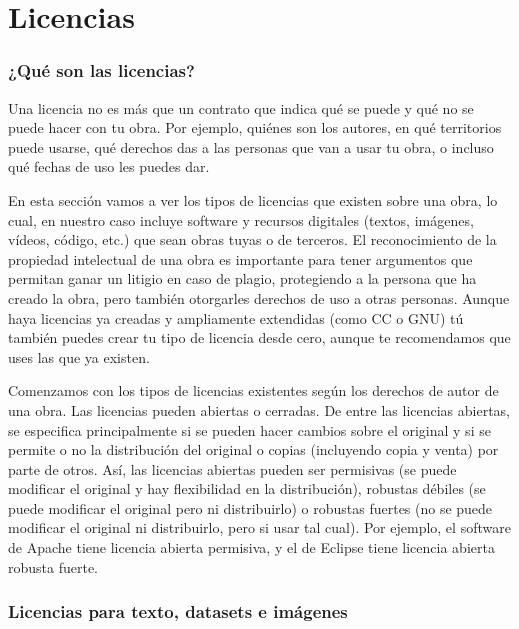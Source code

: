 \appendix
\chapter{Licencias} \label{anexo:licencias}
\subsection{¿Qué son las licencias?}

Una licencia no es más que un contrato que indica qué se puede y qué no se puede hacer con tu obra. Por ejemplo, quiénes son los autores, en qué territorios puede usarse, qué derechos das a las personas que van a usar tu obra, o incluso qué fechas de uso les puedes dar. 

En esta sección vamos a ver los tipos de licencias que existen sobre una obra, lo cual, en nuestro caso incluye software y recursos digitales (textos, imágenes, vídeos, código, etc.) que sean obras tuyas o de terceros. El reconocimiento de la propiedad intelectual de una obra es importante para tener argumentos que permitan ganar un litigio en caso de plagio, protegiendo a la persona que ha creado la obra, pero también otorgarles derechos de uso a otras personas. Aunque haya licencias ya creadas y ampliamente extendidas (como CC o GNU) tú también puedes crear tu tipo de licencia desde cero, aunque te recomendamos que uses las que ya existen.

Comenzamos con los tipos de licencias existentes según los derechos de autor de una obra. Las licencias pueden abiertas o cerradas. De entre las licencias abiertas, se especifica principalmente si se pueden hacer cambios sobre el original y si se permite o no la distribución del original o copias (incluyendo copia y venta) por parte de otros. Así, las licencias abiertas pueden ser permisivas (se puede modificar el original y hay flexibilidad en la distribución), robustas débiles (se puede modificar el original pero ni distribuirlo) o robustas fuertes (no se puede modificar el original ni distribuirlo, pero si usar tal cual). Por ejemplo, el software de Apache tiene licencia abierta permisiva, y el de Eclipse tiene licencia abierta robusta fuerte.

\subsection{Licencias para texto, datasets e imágenes}

